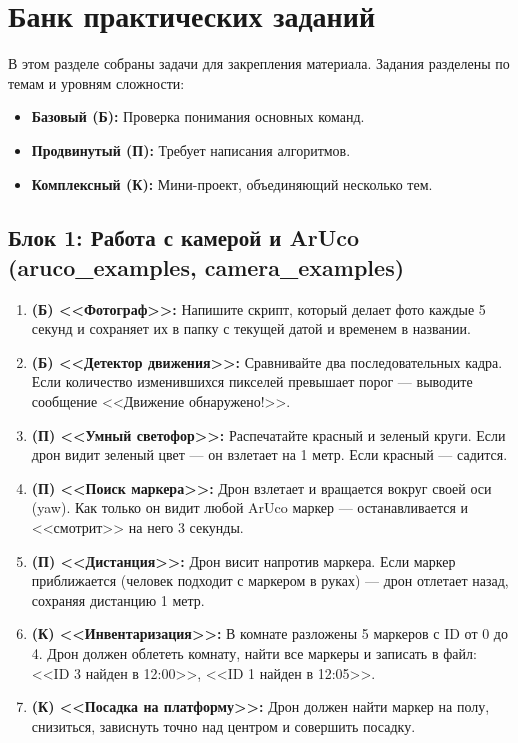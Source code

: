 \section{Банк практических заданий}

В этом разделе собраны задачи для закрепления материала. Задания разделены по темам и уровням сложности:
\begin{itemize}
    \item \textbf{Базовый (Б):} Проверка понимания основных команд.
    \item \textbf{Продвинутый (П):} Требует написания алгоритмов.
    \item \textbf{Комплексный (К):} Мини-проект, объединяющий несколько тем.
\end{itemize}

\subsection{Блок 1: Работа с камерой и ArUco (aruco\_examples, camera\_examples)}

\begin{enumerate}
    \item \textbf{(Б) <<Фотограф>>:} Напишите скрипт, который делает фото каждые 5 секунд и сохраняет их в папку с текущей датой и временем в названии.
    \item \textbf{(Б) <<Детектор движения>>:} Сравнивайте два последовательных кадра. Если количество изменившихся пикселей превышает порог — выводите сообщение <<Движение обнаружено!>>.
    \item \textbf{(П) <<Умный светофор>>:} Распечатайте красный и зеленый круги. Если дрон видит зеленый цвет — он взлетает на 1 метр. Если красный — садится.
    \item \textbf{(П) <<Поиск маркера>>:} Дрон взлетает и вращается вокруг своей оси (yaw). Как только он видит любой ArUco маркер — останавливается и <<смотрит>> на него 3 секунды.
    \item \textbf{(П) <<Дистанция>>:} Дрон висит напротив маркера. Если маркер приближается (человек подходит с маркером в руках) — дрон отлетает назад, сохраняя дистанцию 1 метр.
    \item \textbf{(К) <<Инвентаризация>>:} В комнате разложены 5 маркеров с ID от 0 до 4. Дрон должен облететь комнату, найти все маркеры и записать в файл: <<ID 3 найден в 12:00>>, <<ID 1 найден в 12:05>>.
    \item \textbf{(К) <<Посадка на платформу>>:} Дрон должен найти маркер на полу, снизиться, зависнуть точно над центром и совершить посадку.
\end{enumerate}

